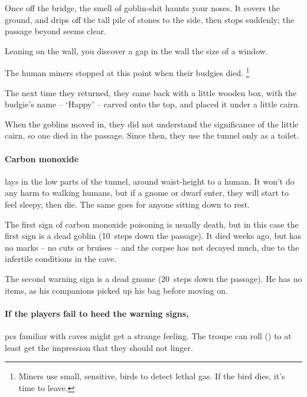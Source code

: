 \begin{multicols}{2}

\begin{boxtext}
  Once off the bridge, the smell of goblin-shit haunts your noses.
  It covers the ground, and drips off the tall pile of stones to the side, then stops suddenly; the passage beyond seems clear.

  Leaning on the wall, you discover a gap in the wall the size of a window.
\end{boxtext}


\begin{exampletext}
  The human miners stopped at this point when their budgies died.%
  \footnote{Miners use small, sensitive, birds to detect lethal gas.  If the bird dies, it's time to leave.}

  The next time they returned, they came back with a little wooden box, with the budgie's name -- `Happy' -- carved onto the top, and placed it under a little cairn.

  When the goblins moved in, they did not understand the significance of the little cairn, so one died in the passage.
  Since then, they use the tunnel only as a toilet.
\end{exampletext}

\paragraph{Carbon monoxide}
lays in the low parts of the tunnel, around waist-height to a human.
It won't do any harm to walking humans, but if a gnome or dwarf enter, they will start to feel sleepy, then die.
The same goes for anyone sitting down to rest.

The first sign of carbon monoxide poisoning is usually death, but in this case the first sign is a dead goblin (10~\glspl{step} down the passage).
It died weeks ago, but has no marks -- no cuts or bruises -- and the corpse has not decayed much, due to the infertile conditions in the cave.

The second warning sign is a dead gnome (20~\glspl{step} down the passage).
He has no items, as his companions picked up his bag before moving on.

\paragraph{If the players fail to heed the warning signs,}
\glspl{pc} familiar with caves might get a strange feeling.
The troupe can roll  (\tn[13]) to at least get the impression that they should not linger.


\end{multicols}
